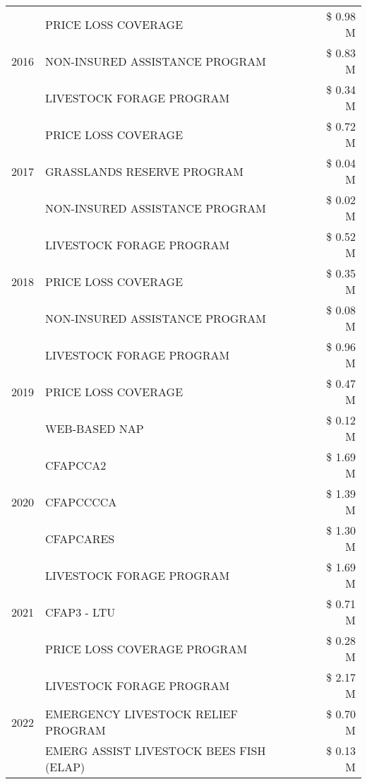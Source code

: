 \begin{tabular}{llr}
\cline{1-3}
\multirow[t]{3}{*}{2016} & PRICE LOSS COVERAGE & \$ 0.98 M \\
 & NON-INSURED ASSISTANCE PROGRAM & \$ 0.83 M \\
 & LIVESTOCK FORAGE PROGRAM & \$ 0.34 M \\
\cline{1-3}
\multirow[t]{3}{*}{2017} & PRICE LOSS COVERAGE & \$ 0.72 M \\
 & GRASSLANDS RESERVE PROGRAM & \$ 0.04 M \\
 & NON-INSURED ASSISTANCE PROGRAM & \$ 0.02 M \\
\cline{1-3}
\multirow[t]{3}{*}{2018} & LIVESTOCK FORAGE PROGRAM & \$ 0.52 M \\
 & PRICE LOSS COVERAGE & \$ 0.35 M \\
 & NON-INSURED ASSISTANCE PROGRAM & \$ 0.08 M \\
\cline{1-3}
\multirow[t]{3}{*}{2019} & LIVESTOCK FORAGE PROGRAM & \$ 0.96 M \\
 & PRICE LOSS COVERAGE & \$ 0.47 M \\
 & WEB-BASED NAP & \$ 0.12 M \\
\cline{1-3}
\multirow[t]{3}{*}{2020} & CFAPCCA2 & \$ 1.69 M \\
 & CFAPCCCCA & \$ 1.39 M \\
 & CFAPCARES & \$ 1.30 M \\
\cline{1-3}
\multirow[t]{3}{*}{2021} & LIVESTOCK FORAGE PROGRAM & \$ 1.69 M \\
 & CFAP3 - LTU & \$ 0.71 M \\
 & PRICE LOSS COVERAGE PROGRAM & \$ 0.28 M \\
\cline{1-3}
\multirow[t]{3}{*}{2022} & LIVESTOCK FORAGE PROGRAM & \$ 2.17 M \\
 & EMERGENCY LIVESTOCK RELIEF PROGRAM & \$ 0.70 M \\
 & EMERG ASSIST LIVESTOCK BEES FISH (ELAP) & \$ 0.13 M \\
\cline{1-3}
\bottomrule
\end{tabular}

